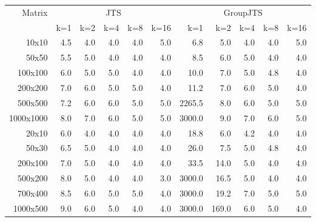 \begin{tabular}{rrrrrrrrrrr}
\toprule
Matrix & \multicolumn{5}{c}{JTS} & \multicolumn{5}{c}{GroupJTS} \\
& k=1 & k=2 & k=4 & k=8 & k=16 & k=1 & k=2 & k=4 & k=8 & k=16 \\
\midrule
10x10 & 4.5 & 4.0 & 4.0 & 4.0 & 5.0 & 6.8 & 5.0 & 4.0 & 4.0 & 5.0 \\
50x50 & 5.5 & 5.0 & 4.0 & 4.0 & 4.0 & 8.5 & 6.0 & 5.0 & 4.0 & 4.0 \\
100x100 & 6.0 & 5.0 & 5.0 & 4.0 & 4.0 & 10.0 & 7.0 & 5.0 & 4.8 & 4.0 \\
200x200 & 7.0 & 6.0 & 5.0 & 5.0 & 4.0 & 11.2 & 7.0 & 6.0 & 5.0 & 4.0 \\
500x500 & 7.2 & 6.0 & 6.0 & 5.0 & 5.0 & 2265.5 & 8.0 & 6.0 & 5.0 & 5.0 \\
1000x1000 & 8.0 & 7.0 & 6.0 & 5.0 & 5.0 & 3000.0 & 9.0 & 7.0 & 6.0 & 5.0 \\
20x10 & 6.0 & 4.0 & 4.0 & 4.0 & 4.0 & 18.8 & 6.0 & 4.2 & 4.0 & 4.0 \\
50x30 & 6.5 & 5.0 & 4.0 & 4.0 & 4.0 & 26.0 & 7.5 & 5.0 & 4.8 & 4.0 \\
200x100 & 7.0 & 5.0 & 4.0 & 4.0 & 4.0 & 33.5 & 14.0 & 5.0 & 4.0 & 4.0 \\
500x200 & 8.0 & 5.0 & 4.0 & 4.0 & 3.0 & 3000.0 & 16.5 & 5.0 & 4.0 & 4.0 \\
700x400 & 8.5 & 6.0 & 5.0 & 5.0 & 4.0 & 3000.0 & 19.2 & 7.0 & 5.0 & 5.0 \\
1000x500 & 9.0 & 6.0 & 5.0 & 4.0 & 4.0 & 3000.0 & 169.0 & 6.0 & 5.0 & 4.0 \\
\bottomrule
\end{tabular}

